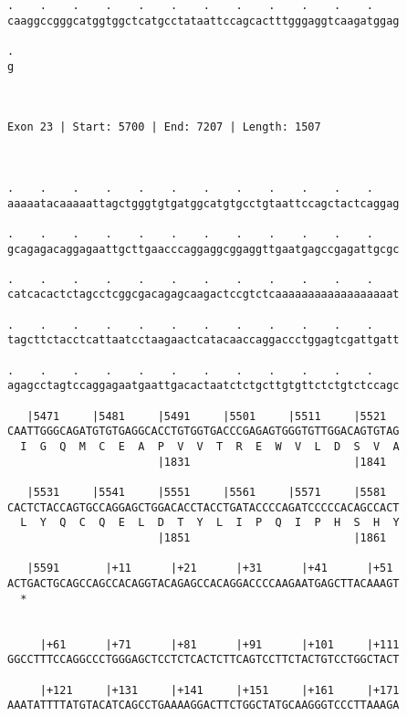 \documentclass{article}
\begin{document}
\begin{Verbatim}
.    .    .    .    .    .    .    .    .    .    .    .    
caaggccgggcatggtggctcatgcctataattccagcactttgggaggtcaagatggag
                                                            
.
g
 
 
 
Exon 23 | Start: 5700 | End: 7207 | Length: 1507



.    .    .    .    .    .    .    .    .    .    .    .    
aaaaatacaaaaattagctgggtgtgatggcatgtgcctgtaattccagctactcaggag
                                                            
.    .    .    .    .    .    .    .    .    .    .    .    
gcagagacaggagaattgcttgaacccaggaggcggaggttgaatgagccgagattgcgc
                                                            
.    .    .    .    .    .    .    .    .    .    .    .    
catcacactctagcctcggcgacagagcaagactccgtctcaaaaaaaaaaaaaaaaaat
                                                            
.    .    .    .    .    .    .    .    .    .    .    .    
tagcttctacctcattaatcctaagaactcatacaaccaggaccctggagtcgattgatt
                                                            
.    .    .    .    .    .    .    .    .    .    .    .    
agagcctagtccaggagaatgaattgacactaatctctgcttgtgttctctgtctccagc
                                                            
   |5471     |5481     |5491     |5501     |5511     |5521  
CAATTGGGCAGATGTGTGAGGCACCTGTGGTGACCCGAGAGTGGGTGTTGGACAGTGTAG
  I  G  Q  M  C  E  A  P  V  V  T  R  E  W  V  L  D  S  V  A
                       |1831                         |1841  
  
   |5531     |5541     |5551     |5561     |5571     |5581  
CACTCTACCAGTGCCAGGAGCTGGACACCTACCTGATACCCCAGATCCCCCACAGCCACT
  L  Y  Q  C  Q  E  L  D  T  Y  L  I  P  Q  I  P  H  S  H  Y
                       |1851                         |1861  
  
   |5591       |+11      |+21      |+31      |+41      |+51 
ACTGACTGCAGCCAGCCACAGGTACAGAGCCACAGGACCCCAAGAATGAGCTTACAAAGT
  *   
                                                            
  
     |+61      |+71      |+81      |+91      |+101     |+111
GGCCTTTCCAGGCCCTGGGAGCTCCTCTCACTCTTCAGTCCTTCTACTGTCCTGGCTACT
                                                            
     |+121     |+131     |+141     |+151     |+161     |+171
AAATATTTTATGTACATCAGCCTGAAAAGGACTTCTGGCTATGCAAGGGTCCCTTAAAGA
                                                            

\end{Verbatim}
\end{document}
